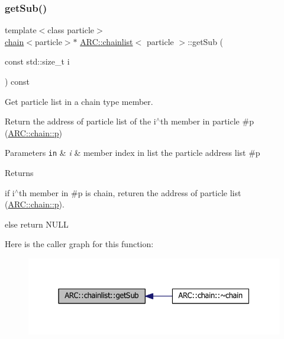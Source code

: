 \subsubsection{\texorpdfstring{get\+Sub()}{getSub()}}
{\footnotesize\ttfamily template$<$class particle$>$ \\
\hyperlink{classARC_1_1chain}{chain}$<$particle$>$$\ast$ \hyperlink{classARC_1_1chainlist}{A\+R\+C\+::chainlist}$<$ particle $>$\+::get\+Sub (\begin{DoxyParamCaption}\item[{const std\+::size\+\_\+t}]{i }\end{DoxyParamCaption}) const\hspace{0.3cm}{\ttfamily [inline]}}



Get particle list in a chain type member. 

Return the address of particle list of the i$^\wedge$th member in particle \#p (\hyperlink{classARC_1_1chain_af1793b656e139e1f87c2e0a55f87514b}{A\+R\+C\+::chain\+::p}) 
\begin{DoxyParams}[1]{Parameters}
\mbox{\tt in}  & {\em i} & member index in list the particle address list \#p \\
\hline
\end{DoxyParams}
\begin{DoxyReturn}{Returns}

\begin{DoxyItemize}
\item if i$^\wedge$th member in \#p is chain, returen the address of particle list (\hyperlink{classARC_1_1chain_af1793b656e139e1f87c2e0a55f87514b}{A\+R\+C\+::chain\+::p}).
\item else return N\+U\+LL 
\end{DoxyItemize}
\end{DoxyReturn}
Here is the caller graph for this function\+:
\nopagebreak
\begin{figure}[H]
\begin{center}
\leavevmode
\includegraphics[width=331pt]{classARC_1_1chainlist_a14c6b75c2d3e97cf9babcac2aa014e8a_icgraph}
\end{center}
\end{figure}
\hypertarget{classARC_1_1chainlist_a84a2c65edf27bd25254e188ebf7d5dce}{}\label{classARC_1_1chainlist_a84a2c65edf27bd25254e188ebf7d5dce} 
